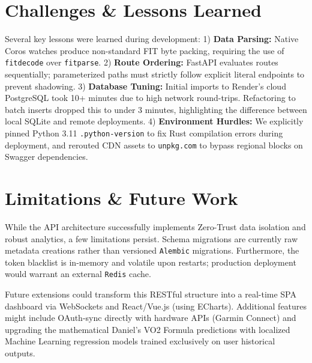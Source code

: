 \documentclass[10pt,a4paper]{article}
\begin{document}
\section{Challenges \& Lessons Learned}

Several key lessons were learned during development:
1) \textbf{Data Parsing:} Native Coros watches produce non-standard FIT byte packing, requiring the use of \texttt{fitdecode} over \texttt{fitparse}.
2) \textbf{Route Ordering:} FastAPI evaluates routes sequentially; parameterized paths must strictly follow explicit literal endpoints to prevent shadowing.
3) \textbf{Database Tuning:} Initial imports to Render's cloud PostgreSQL took 10+ minutes due to high network round-trips. Refactoring to batch inserts dropped this to under 3 minutes, highlighting the difference between local SQLite and remote deployments.
4) \textbf{Environment Hurdles:} We explicitly pinned Python 3.11 \texttt{.python-version} to fix Rust compilation errors during deployment, and rerouted CDN assets to \texttt{unpkg.com} to bypass regional blocks on Swagger dependencies.

\section{Limitations \& Future Work}

While the API architecture successfully implements Zero-Trust data isolation and robust analytics, a few limitations persist. Schema migrations are currently raw metadata creations rather than versioned \texttt{Alembic} migrations. Furthermore, the token blacklist is in-memory and volatile upon restarts; production deployment would warrant an external \texttt{Redis} cache. 

Future extensions could transform this RESTful structure into a real-time SPA dashboard via WebSockets and React/Vue.js (using ECharts). Additional features might include OAuth-sync directly with hardware APIs (Garmin Connect) and upgrading the mathematical Daniel’s VO2 Formula predictions with localized Machine Learning regression models trained exclusively on user historical outputs.



\end{document}
